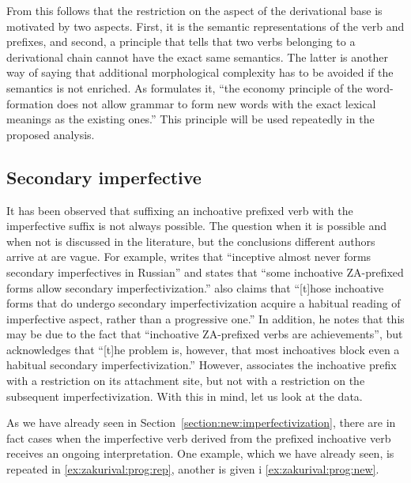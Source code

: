 From this follows that the restriction on the aspect of the derivational base is motivated by two aspects. First, it is the semantic representations of the verb and prefixes, and second, a principle that tells that two verbs belonging to a derivational chain cannot have the exact same semantics. The latter is another way of saying that additional morphological complexity has to be avoided if the semantics is not enriched. As \citet{Braginsky:08} formulates it, ``the economy principle of the word-formation does not allow grammar to form new words with the
exact lexical meanings as the existing ones.'' This principle will be used repeatedly in the proposed analysis.


\subsection{Secondary imperfective}
It has been observed that suffixing an inchoative prefixed verb with the imperfective suffix is not always possible. The question when it is possible and when not is discussed in the literature, but the conclusions different authors arrive at are vague. For example, \citet[230]{Svenonius:04b} writes that ``inceptive  almost never forms secondary imperfectives in Russian'' and \citet[220]{Braginsky:08} states that ``some inchoative ZA-prefixed forms allow secondary imperfectivization.'' \citet[231]{Braginsky:08} also claims that ``[t]hose inchoative forms that do undergo secondary imperfectivization acquire a habitual reading of imperfective aspect, rather than a progressive one.'' In addition, he notes that this may be due to the fact that ``inchoative ZA-prefixed verbs are achievements'', but acknowledges that ``[t]he problem is, however, that most inchoatives block even a habitual secondary imperfectivization.'' However, \citet{Tatevosov:09} associates the inchoative prefix  with a restriction on its attachment site, but not with a restriction on the subsequent imperfectivization. With this in mind, let us look at the data. 

As we have already seen in Section~\ref{section:new:imperfectivization}, there are in fact cases when the imperfective verb derived from the prefixed inchoative verb receives an ongoing interpretation. One example, which we have already seen, is repeated in \ref{ex:zakurival:prog:rep}, another is given i \ref{ex:zakurival:prog:new}.

